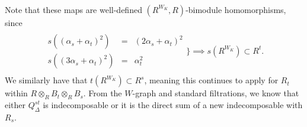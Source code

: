 \begin{example}
\begin{align*}
\end{align*}
\noindent Note that these maps are well-defined $(R^{W_K}, R)$-bimodule homomorphisms, since
\begin{align*}
\begin{split}
\begin{array}{rrr}s((\alpha_s+\alpha_t)^2) &= &(2\alpha_s + \alpha_t)^2\\ s((3\alpha_s+\alpha_t)^2) &= &\alpha_t^2\end{array}\bigg\}\implies s(R^{W_K}) \subset R^t.
\end{split}
\end{align*}
\noindent We similarly have that $t(R^{W_K}) \subset R^s$, meaning this continues to apply for $R_t$ within $R \otimes_R B_t \otimes_R B_s$. From the $W$-graph and standard filtrations, we know that either $Q^{st}_\Delta$ is indecomposable or it is the direct sum of a new indecomposable with $R_s$.
\end{example}
\newpage

